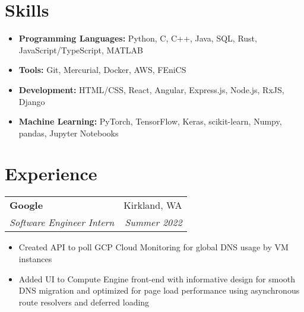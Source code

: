 \documentclass[letterpaper,11pt]{article}
\makeatletter
\newcommand{\resitem}[1]{\item[--] #1}
\newcommand{\ressubheading}[4]{
	\vspace{3pt}
	\begin{tabular*}{7.5in}{l@{\extracolsep{\fill}}r}
			\textbf{#1} & #2 \\
			\textit{#3} & \textit{#4}
	\end{tabular*}
}
\makeatother
\begin{document}


\section{Skills}

\begin{itemize}
	\resitem{
		\textbf{Programming Languages:}
			Python,
			C,
			C++,
			Java,
			SQL,
			Rust,
			JavaScript/TypeScript,
			MATLAB
	}
	\resitem{
		\textbf{Tools:}
			Git,
			Mercurial,
			Docker,
			AWS,
			FEniCS
	}
	\resitem{
		\textbf{Development:}
			HTML/CSS,
			React,
			Angular,
			Express.js,
			Node.js,
			RxJS,
			Django
	}
	\resitem{
		\textbf{Machine Learning:}
			PyTorch,
			TensorFlow,
			Keras,
			scikit-learn,
			Numpy,
			pandas,
			Jupyter Notebooks
	}
\end{itemize}

\section{Experience}

\ressubheading{Google}
			  {Kirkland, WA}
			  {Software Engineer Intern}
			  {Summer 2022}
\begin{itemize}
	\resitem{
		Created API to poll GCP Cloud Monitoring for global DNS usage by VM
		instances
	}
	\resitem{
		Added UI to Compute Engine front-end with informative design for
		smooth DNS migration and optimized for page load performance using
		asynchronous route resolvers and deferred loading
	}
\end{itemize}
\end{document}
